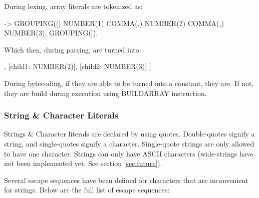 \documentclass[12pt, letterpaper, oneside]{article}
\begin{document}
	During lexing, array literals are tokenized as:
	\begin{spverbatim}
		[1, 2, 3] -> GROUPING([) NUMBER(1) COMMA(,) NUMBER(2) COMMA(,) NUMBER(3), GROUPING(]).
	\end{spverbatim}
	Which then, during parsing, are turned into: \newline
	\begin{forest}
		[ARRAY\_LITERAL
		[child0: NUMBER(1)],
		[child1: NUMBER(2)],
		[child2: NUMBER(3)]
		]
	\end{forest}
	During bytecoding, if they are able to be turned into a constant, they are. If not, they are build during execution using BUILDARRAY instruction.
	\newpage
	\subsubsection{String \& Character Literals}
	Strings \& Character literals are declared by using quotes. Double-quotes signify a string, and single-quotes signify a character. Single-quote strings are only allowed to have one character. Strings can only have ASCII characters (wide-strings have not been implemented yet. See section \ref{sec:future}).
	
	Several escape sequences have been defined for characters that are inconvenient for strings. Below are the full list of escape sequences:
	
\end{document}
